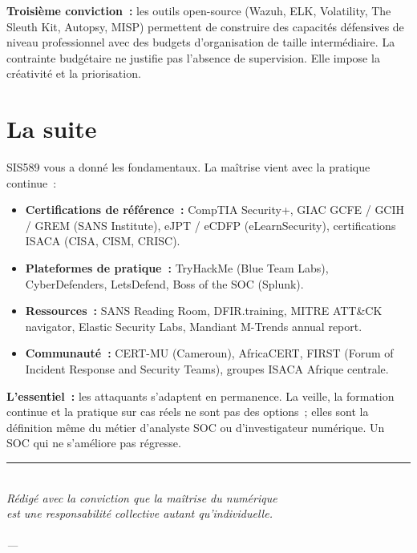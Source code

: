 \textbf{Troisième conviction~:} les outils open-source (Wazuh, ELK,
Volatility, The Sleuth Kit, Autopsy, MISP) permettent de construire
des capacités défensives de niveau professionnel avec des budgets
d'organisation de taille intermédiaire. La contrainte budgétaire ne
justifie pas l'absence de supervision. Elle impose la créativité
et la priorisation.

\section*{La suite}

SIS589 vous a donné les fondamentaux. La maîtrise vient avec la pratique
continue~:

\begin{itemize}
  \item \textbf{Certifications de référence~:} CompTIA Security+,
        GIAC GCFE / GCIH / GREM (SANS Institute), eJPT / eCDFP (eLearnSecurity),
        certifications ISACA (CISA, CISM, CRISC).
  \item \textbf{Plateformes de pratique~:} TryHackMe (Blue Team Labs),
        CyberDefenders, LetsDefend, Boss of the SOC (Splunk).
  \item \textbf{Ressources~:} SANS Reading Room, DFIR.training,
        MITRE ATT\&CK navigator, Elastic Security Labs,
        Mandiant M-Trends annual report.
  \item \textbf{Communauté~:} CERT-MU (Cameroun), AfricaCERT,
        FIRST (Forum of Incident Response and Security Teams),
        groupes ISACA Afrique centrale.
\end{itemize}

\begin{boxresume}
\textbf{L'essentiel~:} les attaquants s'adaptent en permanence.
La veille, la formation continue et la pratique sur cas réels ne
sont pas des options~; elles sont la définition même du métier
d'analyste SOC ou d'investigateur numérique. Un SOC qui ne s'améliore
pas régresse.
\end{boxresume}

\vspace{3ex}
\begin{center}
  {\color{CouleurAccent}\rule{0.55\linewidth}{1pt}}\\[1ex]
  {\small\itshape\color{CouleurPrimaire}
    Rédigé avec la conviction que la maîtrise du numérique\\
    est une responsabilité collective autant qu'individuelle.}\\[0.7ex]
  {\small\bfseries\color{CouleurPrimaire}\auteurcours}\\
  {\footnotesize\color{CouleurBordInfo}\itshape
    \institutionprimaire{} --- \anneescolaire}
\end{center}
